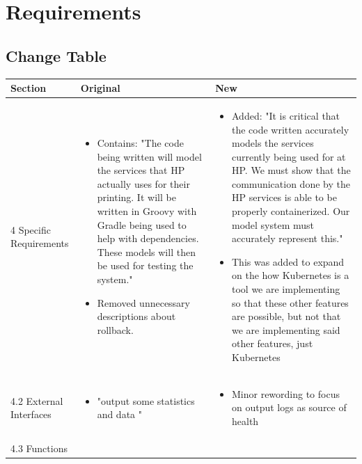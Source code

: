 \documentclass[onecolumn, draftclsnofoot,10pt, compsoc]{IEEEtran}
\begin{document}

\section{Requirements}

\subsection{Change Table}
  
\begin{longtable}{ | m{8em} | m{24em}| m{16em}| } 
\hline
Section&
Original&
New
\\ \hline

4 Specific Requirements&
\begin{itemize}
  \item Contains: "The code being written will model the services that HP actually uses for their printing. It will be written in Groovy with Gradle being used to help with dependencies. These models will then be used for testing the system."
  \item Removed unnecessary descriptions about rollback.
\end{itemize}&
\begin{itemize}
  \item Added: "It is critical that the code written accurately models the services currently being used for at HP. We must show that the communication done by the HP services is able to be properly containerized. Our model system must accurately represent this."
  \item This was added to expand on the how Kubernetes is a tool we are implementing so that these other features are possible, but not that we are implementing said other features, just Kubernetes
\end{itemize}
\\
\hline
4.2 External Interfaces&
\begin{itemize}
  \item "output some statistics and data "
\end{itemize}&
\begin{itemize}
  \item Minor rewording to focus on output logs as source of health
\end{itemize}
\\
\hline
4.3 Functions&
\begin{itemize}

\end{itemize}
\end{longtable}
\end{document}
